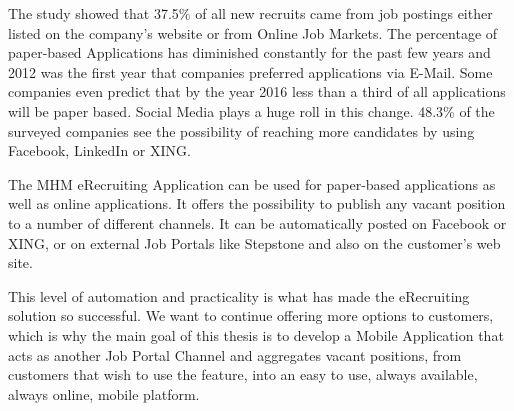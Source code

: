 The study showed that 37.5\% of all new recruits came from job postings either listed on the company's website or from Online Job Markets. The percentage of paper-based Applications has diminished constantly for the past few years and 2012 was the first year that companies preferred applications via E-Mail. Some companies even predict that by the year 2016 less than a third of all applications will be paper based. Social Media plays a huge roll in this change. 48.3\% of the surveyed companies see the possibility of reaching more candidates by using Facebook, LinkedIn or XING.\cite[p. 8]{weitzel:2012}

The MHM eRecruiting Application can be used for paper-based applications as well as online applications. It offers the possibility to publish any vacant position to a number of different channels. It can be automatically posted on Facebook or XING, or on external Job Portals like Stepstone and also on the customer's web site.

This level of automation and practicality is what has made the eRecruiting solution so successful. We want to continue offering more options to customers, which is why the main goal of this thesis is to develop a Mobile Application that acts as another Job Portal Channel and aggregates vacant positions, from customers that wish to use the feature, into an easy to use, always available, always online, mobile platform. %


















 
   
